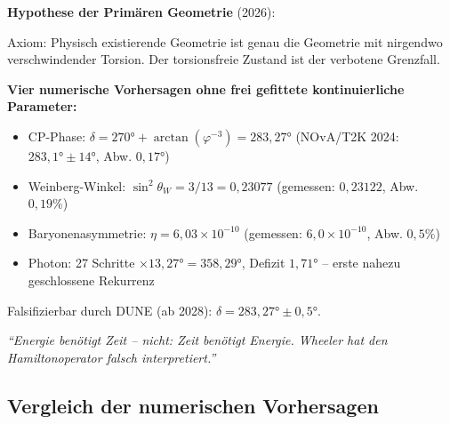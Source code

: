 \begin{avipost}
\textbf{Hypothese der Primären Geometrie} (2026):

\medskip
Axiom: Physisch existierende Geometrie ist genau die Geometrie mit nirgendwo verschwindender Torsion. Der torsionsfreie Zustand ist der verbotene Grenzfall.

\medskip
\textbf{Vier numerische Vorhersagen ohne frei gefittete kontinuierliche Parameter:}
\begin{itemize}[noitemsep]
  \item CP-Phase: $\delta = 270° + \arctan(\varphi^{-3}) = 283{,}27°$ \quad (NOvA/T2K 2024: $283{,}1° \pm 14°$, Abw. $0{,}17°$)
  \item Weinberg-Winkel: $\sin^2\theta_W = 3/13 = 0{,}23077$ \quad (gemessen: $0{,}23122$, Abw. $0{,}19\%$)
  \item Baryonenasymmetrie: $\eta = 6{,}03 \times 10^{-10}$ \quad (gemessen: $6{,}0 \times 10^{-10}$, Abw. $0{,}5\%$)
  \item Photon: 27 Schritte $\times 13{,}27° = 358{,}29°$, Defizit $1{,}71°$ -- erste nahezu geschlossene Rekurrenz
\end{itemize}

\medskip
Falsifizierbar durch DUNE (ab 2028): $\delta = 283{,}27° \pm 0{,}5°$.

\medskip
\textit{``Energie benötigt Zeit -- nicht: Zeit benötigt Energie. Wheeler hat den Hamiltonoperator falsch interpretiert.''}
\end{avipost}

\subsection{Vergleich der numerischen Vorhersagen}

\begin{center}
\end{center}

